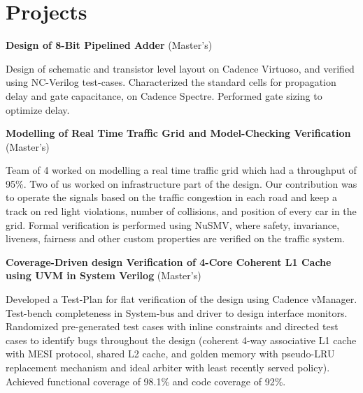 \documentclass[letterpaper,11pt]{article}
\begin{document}
\vspace{-12 pt}
\section{Projects}
 \begin{itemize}[leftmargin=0in, label={}]
    \small{\item{
     \textbf{Design of 8-Bit Pipelined Adder} \hspace{\fill} (Master's)
     \vspace{-10 pt}
     \begin{justify}
     Design of schematic and transistor level layout on Cadence Virtuoso, and verified using NC-Verilog test-cases. Characterized the standard cells for propagation delay and gate capacitance, on Cadence Spectre. Performed gate sizing to optimize delay.
     \end{justify} 
     \vspace{1 pt}
     
    \textbf{Modelling of Real Time Traffic Grid and Model-Checking Verification} \hspace{\fill} (Master's)
     \vspace{-10 pt}
     \begin{justify}
     Team of 4 worked on modelling a real time traffic grid which had a throughput of 95\%. Two of us worked on infrastructure part of the design. Our contribution was to operate the signals based on the traffic congestion in each road and keep a track on red light violations, number of collisions, and position of every car in the grid. Formal verification is performed using NuSMV, where safety, invariance, liveness, fairness and other custom properties are verified on the traffic system.
     \end{justify} 
     \vspace{1 pt}
     
   \textbf{Coverage-Driven design Verification of 4-Core Coherent L1 Cache using UVM in System Verilog} \hspace{\fill} (Master's)
     \vspace{-10 pt}
     \begin{justify}
     Developed a Test-Plan for flat verification of the design using Cadence vManager. Test-bench completeness in System-bus and driver to design interface monitors. Randomized pre-generated test cases with inline constraints and directed test cases to identify bugs throughout the design (coherent 4-way associative L1 cache with MESI protocol, shared L2 cache, and golden memory with pseudo-LRU replacement mechanism and ideal arbiter with least recently served policy). Achieved functional coverage of 98.1\% and code coverage of 92\%.
     \end{justify}
     
}}
\end{itemize}
\end{document}
